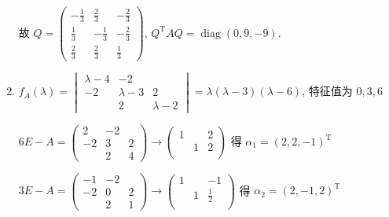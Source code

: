\begin{enumerate}
                   故 \( Q = \begin{pmatrix}
                       -\frac{1}{3} & \frac{2}{3}  & -\frac{2}{3} \\
                       \frac{1}{3}  & -\frac{1}{3} & -\frac{2}{3} \\
                       \frac{2}{3}  & \frac{2}{3}  & \frac{1}{3}
                   \end{pmatrix} \), \( Q^{\mathrm{T}}AQ = \operatorname{diag}(0, 9, -9) \).
             \item %
                   \( f_{A}(\lambda) = \begin{vmatrix}
                       \lambda-4 & -2        &           \\
                       -2        & \lambda-3 & 2         \\
                                 & 2         & \lambda-2
                   \end{vmatrix} = \lambda(\lambda-3)(\lambda-6) \), 特征值为 \( 0, 3, 6 \)

                   \( 6E-A = \begin{pmatrix}
                       2  & -2 &   \\
                       -2 & 3  & 2 \\
                          & 2  & 4
                   \end{pmatrix} \rightarrow \begin{pmatrix}
                       1 &   & 2 \\
                         & 1 & 2 \\
                         &   &
                   \end{pmatrix} \) 得 \( \alpha_{1} = (2, 2, -1)^{\mathrm{T}} \)

                   \( 3E-A = \begin{pmatrix}
                       -1 & -2 &   \\
                       -2 & 0  & 2 \\
                          & 2  & 1
                   \end{pmatrix} \rightarrow \begin{pmatrix}
                       1 &   & -1          \\
                         & 1 & \frac{1}{2} \\
                         &   &
                   \end{pmatrix} \) 得 \( \alpha_{2} = (2, -1, 2)^{\mathrm{T}} \)


\end{enumerate}
